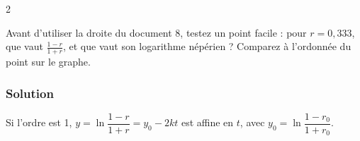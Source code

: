 \documentclass[11pt,a4paper]{article}
\begin{document}
\begin{indication}{2}

Avant d'utiliser la droite du document 8, testez un point facile : pour \(r=0{,}333\), que vaut \(\frac{1-r}{1+r}\), et que vaut son logarithme népérien ? Comparez à l'ordonnée du point sur le graphe.

\end{indication}

\hypertarget{solution-41}{%
\subsubsection{Solution}\label{solution-41}}

Si l'ordre est 1, \(y=\ln\dfrac{1-r}{1+r}=y_0-2kt\) est affine en \(t\), avec \(y_0=\ln\dfrac{1-r_0}{1+r_0}\).
\end{document}
